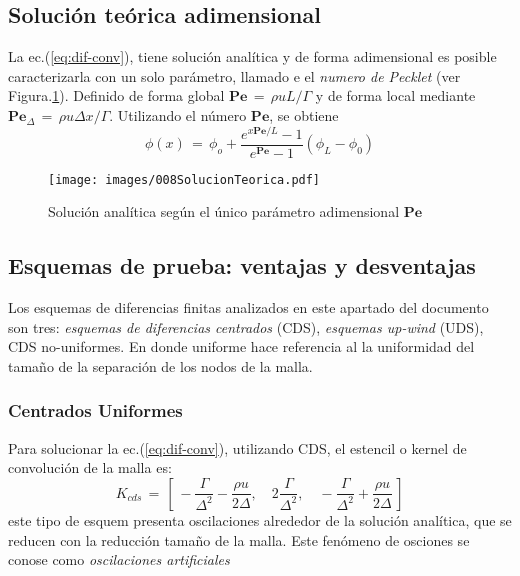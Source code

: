 \documentclass[9pt,technote,twoside,letterpaper,onecolumn]{IEEEtran}
\begin{document}
\begin{multicols}{2}
\subsection{Solución teórica adimensional}
\label{sec:solteo}
La ec.(\ref{eq:dif-conv}), tiene solución analítica y de forma adimensional es posible caracterizarla con un solo parámetro, llamado e el \emph{numero de Pecklet} (ver Figura.\ref{fig:solteo}). Definido de forma global $\mathbf{Pe}\,=\,\rho uL/\Gamma$ y de forma local mediante $\mathbf{Pe}_\Delta\,=\,\rho u\Delta x/\Gamma$. Utilizando el número $\mathbf{Pe}$, se obtiene
\begin{equation}
  \phi(x)\,=\,\phi_o+\frac{e^{x\mathbf{Pe}/L}-1}{e^{\mathbf{Pe}}-1}(\phi_L-\phi_0)
  \label{eq:solteo}
\end{equation}

\begin{figure}[H]
  \centering
  \texttt{[image: images/008SolucionTeorica.pdf]}\\
  \label{fig:solteo}
  \caption{Solución analítica según el único parámetro adimensional $\mathbf{Pe}$}
\end{figure}

\subsection{Esquemas de prueba: ventajas y desventajas}
\label{sec:esquemas}
Los esquemas de diferencias finitas analizados en este apartado del documento son tres: \emph{esquemas de diferencias centrados} (CDS), \emph{esquemas up-wind} (UDS), CDS no-uniformes. En donde uniforme hace referencia al la uniformidad del tamaño de la separación de los nodos de la malla.

\subsubsection{Centrados Uniformes}
\label{sec:esq_centr}
Para solucionar la ec.(\ref{eq:dif-conv}), utilizando CDS, el estencil o kernel de convolución de la malla es:
\begin{equation}
  K_{cds}\,=\,[\,-\frac{\Gamma}{\Delta^2}-\frac{\rho u}{2\Delta},\quad 2\frac{\Gamma}{\Delta^2},\quad -\frac{\Gamma}{\Delta^2}+\frac{\rho u}{2\Delta}\,]
  \label{eq:Kcds}
\end{equation}
este tipo de esquem presenta oscilaciones alrededor de la solución analítica, que se reducen con la reducción tamaño de la malla. Este fenómeno de osciones se conose como \emph{oscilaciones artificiales}


\end{multicols}
\end{document}
